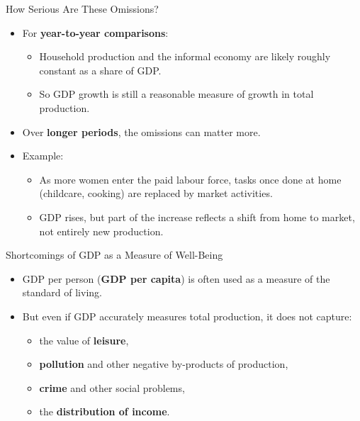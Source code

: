 \documentclass[aspectratio=169]{beamer}
\begin{document}
\begin{frame}{How Serious Are These Omissions?}
\transfade
\begin{itemize}[<+->]
  \item For \textbf{year-to-year comparisons}:
  \begin{itemize}[<+->]
    \item Household production and the informal economy are likely roughly constant as a share of GDP.
    \item So GDP growth is still a reasonable measure of growth in total production.
  \end{itemize}
  \item Over \textbf{longer periods}, the omissions can matter more.
  \item Example:
  \begin{itemize}[<+->]
    \item As more women enter the paid labour force, tasks once done at home (childcare, cooking) are replaced by market activities.
    \item GDP rises, but part of the increase reflects a \alert{shift from home to market}, not entirely new production.
  \end{itemize}
\end{itemize}
\end{frame}

\begin{frame}{Shortcomings of GDP as a Measure of Well-Being}
\transfade
\begin{itemize}[<+->]
  \item GDP per person (\textbf{GDP per capita}) is often used as a measure of the \alert{standard of living}.
  \item But even if GDP accurately measures total production, it does not capture:
  \begin{itemize}[<+->]
    \item the value of \textbf{leisure},
    \item \textbf{pollution} and other negative by-products of production,
    \item \textbf{crime} and other social problems,
    \item the \textbf{distribution of income}.
  \end{itemize}
\end{itemize}
\end{frame}
\end{document}
